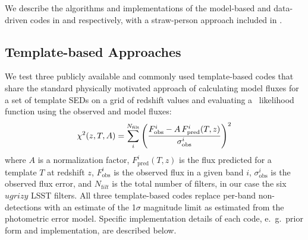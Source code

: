 We describe the algorithms and implementations of the model-based and data-driven codes in  and  respectively, with a straw-person approach included in .
%
%

\subsection{Template-based Approaches}

We test three publicly available and commonly used template-based codes that share the standard physically motivated approach of calculating model fluxes for a set of template SEDs on a grid of redshift values and evaluating a \chisq\ likelihood function using the observed and model fluxes:
\begin{equation} \eqlabel{eq_temp_chi}
\chi^{2}(z,T,A) = \sum_{i}^{N_{\mathrm{filt}}}\left(\frac{F^{i}_{\mathrm{obs}} - A \, F^{i}_{\mathrm{pred}}(T,z)}{\sigma^{i}_{\mathrm{obs}}}\right)^2
\end{equation}
\noindent where $A$ is a normalization factor, $F^i_{\mathrm{pred}}(T,z)$ is the flux predicted for a template $T$ at redshift $z$, $F^i_{\mathrm{obs}}$ is the observed flux in a given band $i$, $\sigma^i_{\mathrm{obs}}$ is the observed flux error, and $N_{\mathrm filt}$ is the total number of filters, in our case the six $ugrizy$ LSST filters.  
All three template-based codes replace per-band non-detections with an estimate of the 1$\sigma$ magnitude limit as estimated from the photometric error model.
Specific implementation details of each code, e.~g.~prior form and implementation, are described below.


